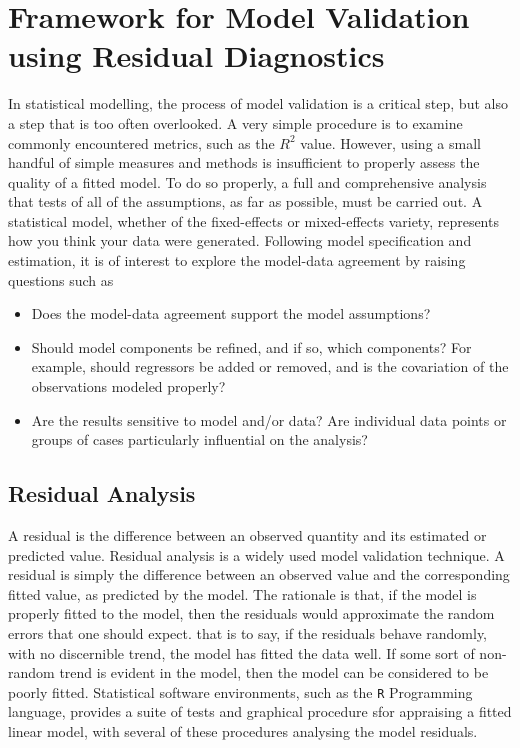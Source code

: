 \documentclass[12pt, a4paper]{report}
\theoremstyle{plain}
\theoremstyle{definition}
\theoremstyle{remark}
\begin{document}
\section{Framework for Model Validation using Residual Diagnostics}
In statistical modelling, the process of model validation is a critical step, but also a step that is too often overlooked. A very simple procedure is to examine commonly encountered
metrics, such as the $R^2$ value. However, using a small handful of simple measures and methods is insufficient to properly assess the quality of a fitted model. To do so properly, a full and comprehensive
analysis that tests of all of the assumptions, as far as possible, must be carried out. A statistical model, whether of the fixed-effects or mixed-effects variety, represents how you think your data
were generated. Following model specification and estimation, it is of interest to explore the model-data
agreement by raising questions such as
\begin{itemize}
	\item Does the model-data agreement support the model assumptions?
	\item Should model components be refined, and if so, which components? For example, should regressors
	be added or removed, and is the covariation of the observations modeled properly?
	\item Are the results sensitive to model and/or data? Are individual data points or groups of cases particularly
	influential on the analysis?
\end{itemize}


\subsection{Residual Analysis}
A residual is the difference between an observed quantity and its
estimated or predicted value. 
Residual analysis is a widely used model validation technique. A residual is simply the difference between an observed value and the corresponding fitted value, as predicted by the model. The rationale is that, if the model is properly fitted to the model, then the residuals would approximate the random errors that one should expect.
that is to say, if the residuals behave randomly, with no discernible trend, the model has fitted the data well. If some sort of non-random trend is evident in the model, then the model can be considered to be poorly fitted.
Statistical software environments, such as the \texttt{R} Programming language, provides a suite of tests and graphical procedure sfor appraising a fitted linear model, with several 
of these procedures analysing the model residuals.
\end{document}
